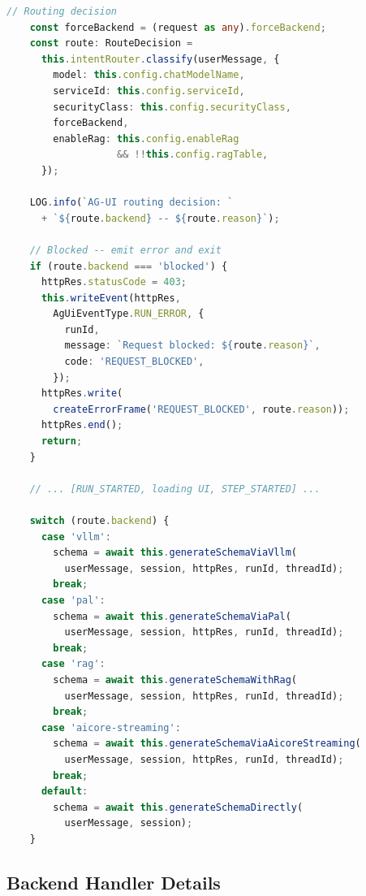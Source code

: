 \documentclass[11pt]{article}
\begin{document}
\begin{lstlisting}[language=TypeScript,caption={Routing decision and dispatch (agent-service.ts, lines 156--212)},firstnumber=156]
    // Routing decision
    const forceBackend = (request as any).forceBackend;
    const route: RouteDecision =
      this.intentRouter.classify(userMessage, {
        model: this.config.chatModelName,
        serviceId: this.config.serviceId,
        securityClass: this.config.securityClass,
        forceBackend,
        enableRag: this.config.enableRag
                   && !!this.config.ragTable,
      });

    LOG.info(`AG-UI routing decision: `
      + `${route.backend} -- ${route.reason}`);

    // Blocked -- emit error and exit
    if (route.backend === 'blocked') {
      httpRes.statusCode = 403;
      this.writeEvent(httpRes,
        AgUiEventType.RUN_ERROR, {
          runId,
          message: `Request blocked: ${route.reason}`,
          code: 'REQUEST_BLOCKED',
        });
      httpRes.write(
        createErrorFrame('REQUEST_BLOCKED', route.reason));
      httpRes.end();
      return;
    }

    // ... [RUN_STARTED, loading UI, STEP_STARTED] ...

    switch (route.backend) {
      case 'vllm':
        schema = await this.generateSchemaViaVllm(
          userMessage, session, httpRes, runId, threadId);
        break;
      case 'pal':
        schema = await this.generateSchemaViaPal(
          userMessage, session, httpRes, runId, threadId);
        break;
      case 'rag':
        schema = await this.generateSchemaWithRag(
          userMessage, session, httpRes, runId, threadId);
        break;
      case 'aicore-streaming':
        schema = await this.generateSchemaViaAicoreStreaming(
          userMessage, session, httpRes, runId, threadId);
        break;
      default:
        schema = await this.generateSchemaDirectly(
          userMessage, session);
    }
\end{lstlisting}

\subsection{Backend Handler Details}
\end{document}
